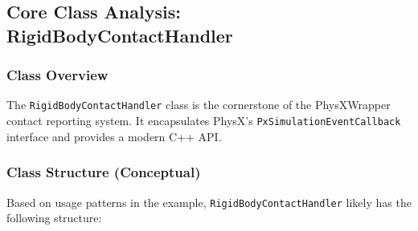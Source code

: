 \subsection{Core Class Analysis: RigidBodyContactHandler}

\subsubsection{Class Overview}

The \texttt{RigidBodyContactHandler} class is the cornerstone of the PhysXWrapper contact reporting system. It encapsulates PhysX's \texttt{PxSimulationEventCallback} interface and provides a modern C++ API.

\subsubsection{Class Structure (Conceptual)}

Based on usage patterns in the example, \texttt{RigidBodyContactHandler} likely has the following structure:

